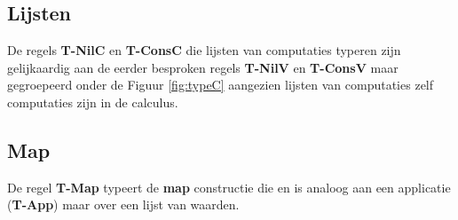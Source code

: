 \subsection{Lijsten}
De regels \textbf{T-NilC} en \textbf{T-ConsC} die lijsten van computaties typeren zijn gelijkaardig aan de eerder besproken regels \textbf{T-NilV} en \textbf{T-ConsV} maar gegroepeerd onder de Figuur \ref{fig:typeC} aangezien lijsten van computaties zelf computaties zijn in de calculus.

\subsection{Map}
De regel \textbf{T-Map} typeert de \textbf{map} constructie die en is analoog aan een applicatie (\textbf{T-App}) maar over een lijst van waarden.


